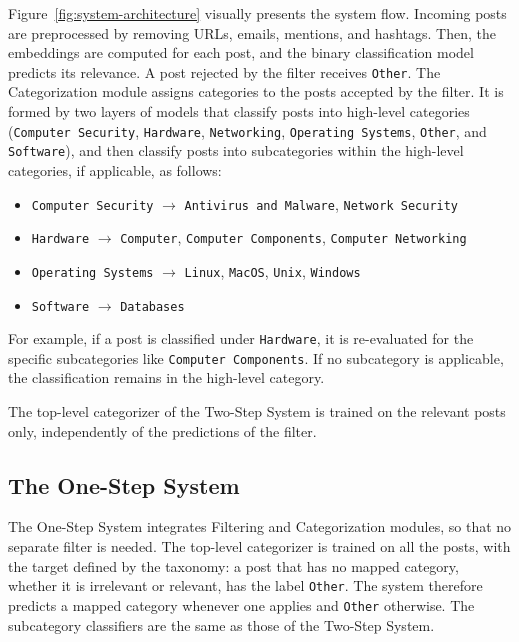 Figure~\ref{fig:system-architecture} visually presents the system flow. Incoming posts are preprocessed by removing URLs, emails, mentions, and hashtags. Then, the embeddings are computed for each post, and the binary classification model predicts its relevance. A post rejected by the filter receives \texttt{Other}. The Categorization module assigns categories to the posts accepted by the filter. It is formed by two layers of models that classify posts into high-level categories (\texttt{Computer Security}, \texttt{Hardware}, \texttt{Networking}, \texttt{Operating Systems}, \texttt{Other}, and \texttt{Software}), and then classify posts into subcategories within the high-level categories, if applicable, as follows:

\begin{itemize}
    \item \texttt{Computer Security} $\rightarrow$ \texttt{Antivirus and Malware}, \texttt{Network Security}
    \item \texttt{Hardware} $\rightarrow$ \texttt{Computer}, \texttt{Computer Components}, \texttt{Computer Networking}
    \item \texttt{Operating Systems} $\rightarrow$ \texttt{Linux}, \texttt{MacOS}, \texttt{Unix}, \texttt{Windows}
    \item \texttt{Software} $\rightarrow$ \texttt{Databases}
\end{itemize}

For example, if a post is classified under \texttt{Hardware}, it is re-evaluated for the specific subcategories like \texttt{Computer Components}. If no subcategory is applicable, the classification remains in the high-level category.

The top-level categorizer of the Two-Step System is trained on the relevant posts only, independently of the predictions of the filter.

\subsection{The One-Step System}\label{subsec:one-step-system}
The One-Step System integrates Filtering and Categorization modules, so that no separate filter is needed. The top-level categorizer is trained on all the posts, with the target defined by the taxonomy: a post that has no mapped category, whether it is irrelevant or relevant, has the label \texttt{Other}. The system therefore predicts a mapped category whenever one applies and \texttt{Other} otherwise. The subcategory classifiers are the same as those of the Two-Step System.

